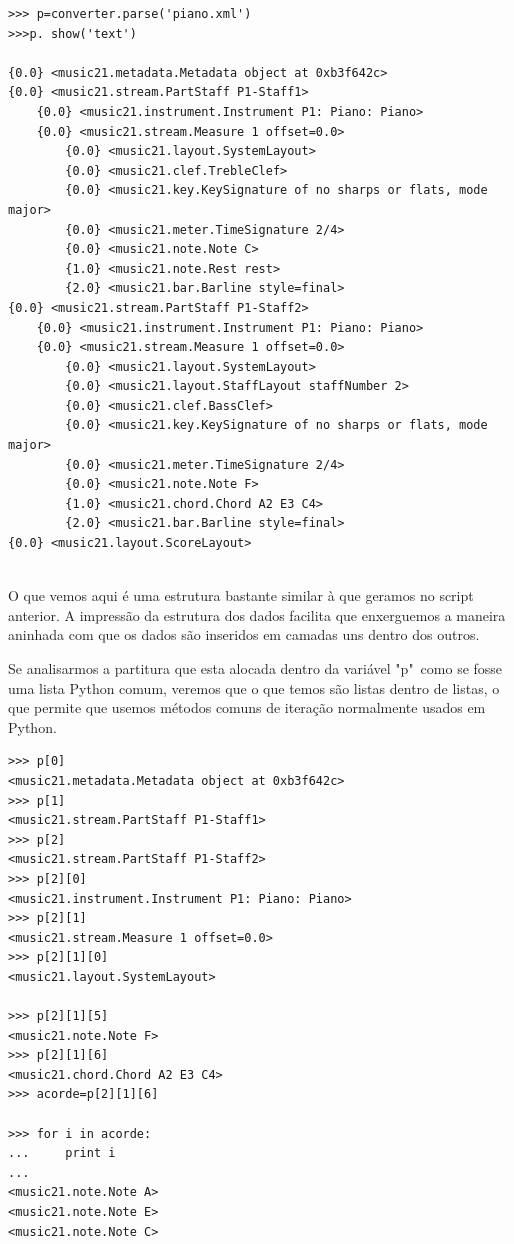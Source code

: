 \documentclass[
	12pt,				%
	openright,			%
	twoside,			%
	a4paper,			%
	english,			%
	french,				%
	spanish,			%
	brazil				%
	]{abntex2}
\begin{document}
\begin{lstlisting}
>>> p=converter.parse('piano.xml')
>>>p. show('text')

{0.0} <music21.metadata.Metadata object at 0xb3f642c>
{0.0} <music21.stream.PartStaff P1-Staff1>
    {0.0} <music21.instrument.Instrument P1: Piano: Piano>
    {0.0} <music21.stream.Measure 1 offset=0.0>
        {0.0} <music21.layout.SystemLayout>
        {0.0} <music21.clef.TrebleClef>
        {0.0} <music21.key.KeySignature of no sharps or flats, mode major>
        {0.0} <music21.meter.TimeSignature 2/4>
        {0.0} <music21.note.Note C>
        {1.0} <music21.note.Rest rest>
        {2.0} <music21.bar.Barline style=final>
{0.0} <music21.stream.PartStaff P1-Staff2>
    {0.0} <music21.instrument.Instrument P1: Piano: Piano>
    {0.0} <music21.stream.Measure 1 offset=0.0>
        {0.0} <music21.layout.SystemLayout>
        {0.0} <music21.layout.StaffLayout staffNumber 2>
        {0.0} <music21.clef.BassClef>
        {0.0} <music21.key.KeySignature of no sharps or flats, mode major>
        {0.0} <music21.meter.TimeSignature 2/4>
        {0.0} <music21.note.Note F>
        {1.0} <music21.chord.Chord A2 E3 C4>
        {2.0} <music21.bar.Barline style=final>
{0.0} <music21.layout.ScoreLayout>


\end{lstlisting}

O que vemos aqui é uma estrutura bastante similar à que geramos no script anterior. A impressão da estrutura dos dados facilita que enxerguemos a maneira aninhada com que os dados são inseridos em camadas uns dentro dos outros.

Se analisarmos a partitura que esta alocada dentro da variável "p"\ como se fosse uma lista Python comum, veremos que o que temos são listas dentro de listas, o que permite que usemos métodos comuns de iteração normalmente usados em Python.

\begin{lstlisting}
>>> p[0]
<music21.metadata.Metadata object at 0xb3f642c>
>>> p[1]
<music21.stream.PartStaff P1-Staff1>
>>> p[2]
<music21.stream.PartStaff P1-Staff2>
>>> p[2][0]
<music21.instrument.Instrument P1: Piano: Piano>
>>> p[2][1]
<music21.stream.Measure 1 offset=0.0>
>>> p[2][1][0]
<music21.layout.SystemLayout>

>>> p[2][1][5]
<music21.note.Note F>
>>> p[2][1][6]
<music21.chord.Chord A2 E3 C4>
>>> acorde=p[2][1][6]

>>> for i in acorde:
...     print i
... 
<music21.note.Note A>
<music21.note.Note E>
<music21.note.Note C>

\end{lstlisting}
\end{document}
